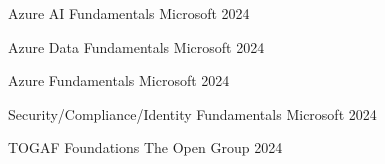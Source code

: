 
\begin{cvhonors}

  \cvhonor
    {Azure AI Fundamentals} %
    {Microsoft} %
    {} %
    {2024} %

  \cvhonor
    {Azure Data Fundamentals} %
    {Microsoft} %
    {} %
    {2024} %

  \cvhonor
    {Azure Fundamentals} %
    {Microsoft} %
    {} %
    {2024} %

  \cvhonor
    {Security/Compliance/Identity Fundamentals} %
    {Microsoft} %
    {} %
    {2024} %

  \cvhonor
    {TOGAF Foundations} %
    {The Open Group} %
    {} %
    {2024} %

\end{cvhonors}
